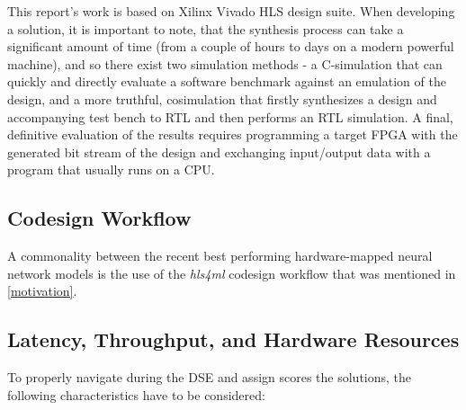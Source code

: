 This report's work is based on Xilinx Vivado HLS design suite. When developing a solution, it is important to note, that the synthesis process can take a significant amount of time (from a couple of hours to days on a modern powerful machine), and so there exist two simulation methods - a C-simulation that can quickly and directly evaluate a software benchmark against an emulation of the design, and a more truthful, cosimulation that firstly synthesizes a design and accompanying test bench to RTL and then performs an RTL simulation. A final, definitive evaluation of the results requires programming a target FPGA with the generated bit stream of the design and exchanging input/output data with a program that usually runs on a CPU.

\todofig{|}
\todofig{|}
\todofig{|}


\subsection{\hlsml Codesign Workflow}
A commonality between the recent best performing hardware-mapped neural network models is the use of the \textit{hls4ml} codesign workflow that was mentioned in \cref{motivation}.
\indo{|}
\indo{|}
\indo{|}
\indo{|}
\indo{|}
\indo{|}
\indo{|}
\indo{|}


\subsection{Latency, Throughput, and Hardware Resources}\label{latency-throughput-resources}
To properly navigate during the DSE and assign scores the solutions, the following characteristics have to be considered:

